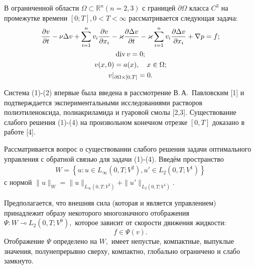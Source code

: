 
\vzmscaption

В ограниченной области $\Omega\subset \mathbb{R}^n (n=2,3)$ с границей $\partial\Omega$ класса $C^3$ на промежутке времени $[0;T], 0<T<\infty$ рассматривается следующая задача:
\begin{gather}
\frac{\partial v}{\partial t}-\nu\Delta v+\sum_{i=1}^n v_i\frac{\partial v}{\partial x_i}-\varkappa\frac{\partial\Delta v}{\partial t}-\varkappa\sum_{i=1}^n v_i\frac{\partial\Delta v}{\partial x_i}+\nabla p=f; \label{Ustiuzhaninova1} \\
{\rm div}\, v=0; \label{Ustiuzhaninova2}\\
v(x,0)=a(x), \quad x\in\Omega; \label{Ustiuzhaninova3}\\
v|_{\partial\Omega\times[0,T]}=0. \label{Ustiuzhaninova4}
\end{gather}

Система (1)-(2) впервые была введена в рассмотрение В.\,А.~Павловским [1] и подтверждается экспериментальными исследованиями растворов полиэтиленоксида, полиакриламида и гуаровой смолы [2,3]. Существование слабого решения (1)-(4) на произвольном конечном отрезке $[0,T]$ доказано в работе [4].

Рассматривается вопрос о существовании слабого решения задачи оптимального управления с обратной связью для задачи (1)-(4). Введём пространство
\begin{gather*}
W=\left\{u: u\in L_\infty(0,T;V^2), u'\in L_2(0,T;V^1) \right\}
\end{gather*}
с нормой $\|u\|_{W}= \|u\|_{L_\infty(0,T;V^2)}+\|u'\|_{L_2(0,T;V^1)}.$


Предполагается, что внешняя сила (которая и является управлением) принадлежит образу некоторого многозначного отображения $\Psi:W \multimap L_2(0,T;V^0),$ которое зависит от скорости движения жидкости:
\begin{equation}
\label{Ustiuzhaninova5}
f\in \Psi (v).
\end{equation}
Отображение $\Psi$ определено на $W,$ имеет непустые, компактные, выпуклые значения, полунепрерывно сверху, компактно, глобально ограничено и слабо замкнуто.


